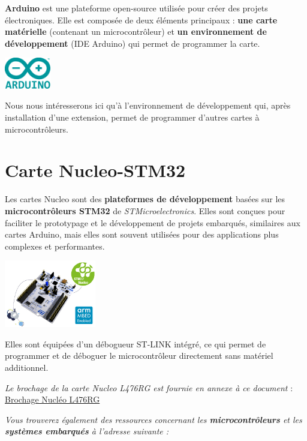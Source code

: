 \documentclass[a4paper,11pt,titlepage]{article} %
\begin{document}
\textbf{Arduino} est une plateforme open-source utilisée pour créer des projets électroniques. Elle est composée de deux éléments principaux : \textbf{une carte matérielle} (contenant un microcontrôleur) et \textbf{un environnement de développement} (IDE Arduino) qui permet de programmer la carte.

\begin{center}
	\includegraphics[width=0.15\textwidth]{images/Arduino_Logo.png}
\end{center}

Nous nous intéresserons ici qu'à l'environnement de développement qui, après installation d'une extension, permet de programmer d'autres cartes à microcontrôleurs.


\section{Carte Nucleo-STM32}

Les cartes Nucleo sont des \textbf{plateformes de développement} basées sur les \textbf{microcontrôleurs STM32} de \textit{STMicroelectronics}. Elles sont conçues pour faciliter le prototypage et le développement de projets embarqués, similaires aux cartes Arduino, mais elles sont souvent utilisées pour des applications plus complexes et performantes.


\begin{center}
	\includegraphics[width=0.3\textwidth]{images/nucleo_board.jpg}
\end{center}

Elles sont équipées d'un débogueur ST-LINK intégré, ce qui permet de programmer et de déboguer le microcontrôleur directement sans matériel additionnel.

\textsl{Le brochage de la carte Nucleo L476RG est fournie en annexe à ce document} : \hyperref[doc:nucleo_pins_476RG]{Brochage Nucléo L476RG}

\textit{Vous trouverez également des ressources concernant les \textbf{microcontrôleurs} et les \textbf{systèmes embarqués} à l'adresse suivante :}
\end{document}
